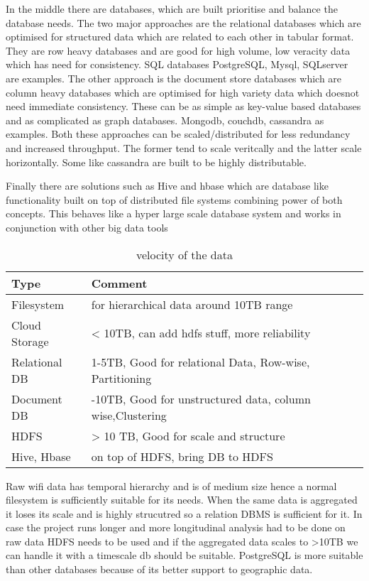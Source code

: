In the middle there are databases, which are built prioritise and balance the database needs.
The two major approaches are the relational databases which are optimised for structured data which are related to each other in tabular format.
They are row heavy databases and are good for high volume, low veracity data which has need for consistency.
SQL databases PostgreSQL, Mysql, SQLserver are examples.
The other approach is the document store databases which are column heavy databases which are optimised for high variety data which doesnot need immediate consistency.
These can be as simple as key-value based databases and as complicated as graph databases.
Mongodb, couchdb, cassandra as examples.
Both these approaches can be scaled/distributed for less redundancy and increased throughput.
The former tend to scale veritcally and the latter scale horizontally.
Some like cassandra are built to be highly distributable.

Finally there are solutions such as Hive and hbase which are database like functionality built on top of distributed file systems combining power of both concepts.
This behaves like a hyper large scale database system and works in conjunction with other big data tools


\begin{table}
    \centering
    \begin{tabular}{|l|l|}
        \hline
        Type & Comment\\
        \hline
        Filesystem & for hierarchical data around 10TB range\\
        Cloud Storage & \textless{}  10TB, can add hdfs stuff, more reliability\\
        Relational DB & 1-5TB, Good for relational Data, Row-wise, Partitioning\\
        Document DB & -10TB, Good for unstructured data, column wise,Clustering\\
        HDFS & \textgreater{} 10 TB, Good for scale and structure\\
        Hive, Hbase & on top of HDFS, bring DB to HDFS\\
        \hline
    \end{tabular}
    \caption{velocity of the data}
    \label{velocity_table}
\end{table}


Raw wifi data has temporal hierarchy and is of medium size hence a normal filesystem is sufficiently suitable for its needs.
When the same data is aggregated it loses its scale and is highly strucutred so a relation DBMS is sufficient for it.
In case the project runs longer and more longitudinal analysis had to be done on raw data HDFS needs to be used and if the aggregated data scales to >10TB we can handle it with a timescale db should be suitable.
PostgreSQL is more suitable than other databases because of its better support to geographic data.

